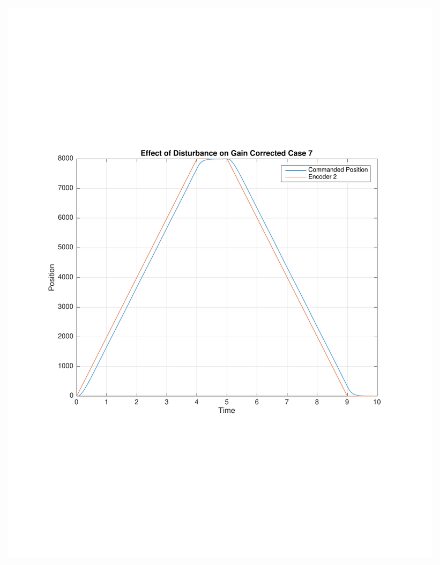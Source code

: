 \documentclass[11pt, a4paper]{article}
\begin{document}
\begin{figure}[H]
\centering
\includegraphics[width = \textwidth]{11.pdf}
\end{figure}
\end{document}
